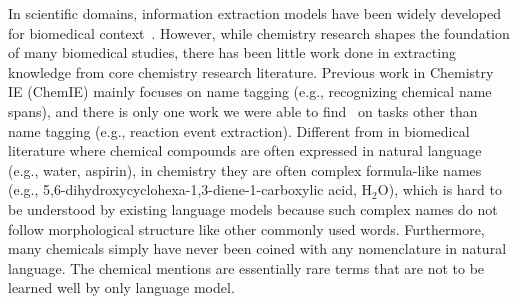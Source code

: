 In scientific domains, information extraction models have been widely developed for biomedical context~\cite{biomedie, biomedpp1, biomedpp2, biomedpp3, biomedpp4, scibert,biobert, biomedpp5,biomedpp6,Lai2021b,Zhang2021,Zhang2021b}.  However, while chemistry research shapes the foundation of many biomedical studies, there has been little work done in extracting knowledge from core chemistry research literature. Previous work in Chemistry IE (ChemIE) mainly focuses on name tagging (e.g., recognizing chemical name spans), and there is only one work we were able to find~\cite{chemu} on tasks other than name tagging (e.g., reaction event extraction). 
Different from in biomedical literature where chemical compounds are often expressed in natural language (e.g., water, aspirin), in chemistry they are often complex formula-like names (e.g., 5,6-dihydroxycyclohexa-1,3-diene-1-carboxylic acid, H$_2$O), which is hard to be understood by existing language models because such complex names do not follow morphological structure like other commonly used words. %
Furthermore, many chemicals simply have never been coined with any nomenclature in natural language. The chemical mentions are essentially rare terms that are not to be learned well by only language model.  




